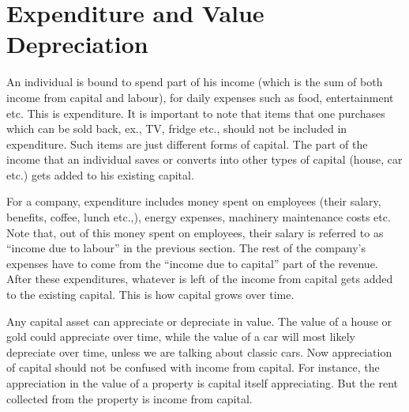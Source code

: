 \section{Expenditure and Value Depreciation} 
An individual is bound to spend part of his income (which is the sum of both income from capital and labour), for daily expenses such as food, entertainment  etc. This is expenditure. It is important to note that items that one purchases which can be sold back, ex., TV, fridge etc., should not be included in expenditure. Such items are just different forms of capital. The part of the income that an individual saves or converts into other types of capital (house, car etc.) gets added to his existing capital.

For a company, expenditure includes money spent on employees (their salary, benefits, coffee, lunch etc.,), energy expenses, machinery maintenance costs etc. Note that, out of this money spent on employees, their salary is referred to as ``income due to labour'' in the previous section. The rest of the company's expenses have to come from the ``income due to capital'' part of the revenue. After these expenditures, whatever is left of the income from capital gets added to the existing capital. This is how capital grows over time. 

Any capital asset can appreciate or depreciate in value. The value of a house or gold could appreciate over time, while the value of a car will most likely depreciate over time, unless we are talking about classic cars. Now appreciation of capital should not be confused with income from capital. For instance, the appreciation in the value of a property is capital itself appreciating. But the rent collected from the property is income from capital. 

  